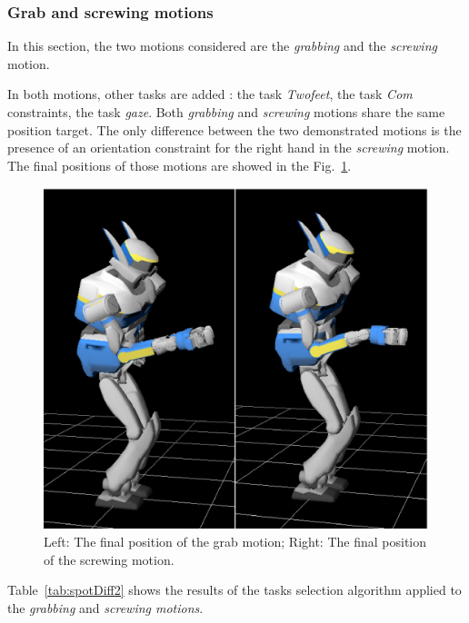 \documentclass[letterpaper, 10pt, conference]{ieeeconf}      %
\begin{document}
\subsubsection{Grab and screwing motions}
\label{sec:distinc2}
In this section, the two motions considered are the \emph{grabbing} and the \emph{screwing}
motion.

In both motions, other tasks are added : the task \emph{Twofeet}, the task \emph{Com} constraints,
the task \emph{gaze}.
Both \emph{grabbing} and \emph{screwing} motions share the same position target. The only difference between
the two demonstrated motions is the
presence of an orientation constraint for the right hand in the \emph{screwing} motion.
The final positions of those motions are showed in the Fig.~\ref{fig:spotDiff2}.
\begin{figure}[t]
\begin{center}
\includegraphics[width=0.55\linewidth]{img/spotDiff2bis.ps}
\end{center}
\caption{Left: The final position of the grab motion; Right: The final position of the screwing motion.}
\label{fig:spotDiff2}
\vspace{-3pt}
\end{figure}
Table~\ref{tab:spotDiff2} shows the results of the tasks selection algorithm applied
to the \emph{grabbing} and \emph{screwing motions}.
\end{document}

